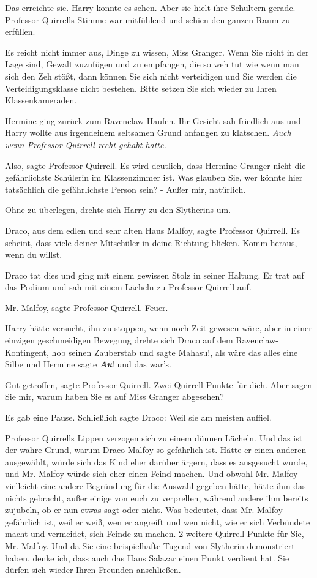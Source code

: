 Das erreichte sie. Harry konnte es sehen. Aber sie hielt ihre Schultern gerade.
Professor Quirrells Stimme war mitfühlend und schien den ganzen Raum zu
erfüllen.

\glqq Es reicht nicht immer aus, Dinge zu wissen, Miss Granger. Wenn Sie nicht
in der Lage sind, Gewalt zuzufügen und zu empfangen, die so weh tut wie wenn man
sich den Zeh stößt, dann können Sie sich nicht verteidigen und Sie werden die
Verteidigungsklasse nicht bestehen. Bitte setzen Sie sich wieder zu Ihren
Klassenkameraden.\grqq{}

Hermine ging zurück zum Ravenclaw-Haufen. Ihr Gesicht sah friedlich aus und
Harry wollte aus irgendeinem seltsamen Grund anfangen zu klatschen. \emph{Auch
wenn Professor Quirrell recht gehabt hatte.}

\glqq Also\grqq{}, sagte Professor Quirrell. \glqq Es wird deutlich, dass
Hermine Granger nicht die gefährlichste Schülerin im Klassenzimmer ist. Was
glauben Sie, wer könnte hier tatsächlich die gefährlichste Person sein? - Außer
mir, natürlich.\grqq{}

Ohne zu überlegen, drehte sich Harry zu den Slytherins um.

\glqq Draco, aus dem edlen und sehr alten Haus Malfoy\grqq{}, sagte Professor
Quirrell. \glqq Es scheint, dass viele deiner Mitschüler in deine Richtung
blicken. Komm heraus, wenn du willst.\grqq{}

Draco tat dies und ging mit einem gewissen Stolz in seiner Haltung. Er trat auf
das Podium und sah mit einem Lächeln zu Professor Quirrell auf.

\glqq Mr. Malfoy\grqq{}, sagte Professor Quirrell. \glqq Feuer.\grqq{}

Harry hätte versucht, ihn zu stoppen, wenn noch Zeit gewesen wäre, aber in einer
einzigen geschmeidigen Bewegung drehte sich Draco auf dem Ravenclaw-Kontingent,
hob seinen Zauberstab und sagte \glqq Mahasu!\grqq{}, als wäre das alles eine
Silbe und Hermine sagte \glqq \textbf{\emph{Au}}!\grqq{} und das war's.

\glqq Gut getroffen\grqq{}, sagte Professor Quirrell. \glqq Zwei
Quirrell-Punkte für dich. Aber sagen Sie mir, warum haben Sie es auf Miss
Granger abgesehen?\grqq{}

Es gab eine Pause. Schließlich sagte Draco: \glqq Weil sie am meisten
auffiel.\grqq{}

Professor Quirrells Lippen verzogen sich zu einem dünnen Lächeln. \glqq Und das
ist der wahre Grund, warum Draco Malfoy so gefährlich ist. Hätte er einen
anderen ausgewählt, würde sich das Kind eher darüber ärgern, dass es ausgesucht
wurde, und Mr. Malfoy würde sich eher einen Feind machen. Und obwohl Mr. Malfoy
vielleicht eine andere Begründung für die Auswahl gegeben hätte, hätte ihm das
nichts gebracht, außer einige von euch zu verprellen, während andere ihm bereits
zujubeln, ob er nun etwas sagt oder nicht. Was bedeutet, dass Mr. Malfoy
gefährlich ist, weil er weiß, wen er angreift und wen nicht, wie er sich
Verbündete macht und vermeidet, sich Feinde zu machen. 2 weitere Quirrell-Punkte
für Sie, Mr. Malfoy. Und da Sie eine beispielhafte Tugend von Slytherin
demonstriert haben, denke ich, dass auch das Haus Salazar einen Punkt verdient
hat. Sie dürfen sich wieder Ihren Freunden anschließen.\grqq{}

